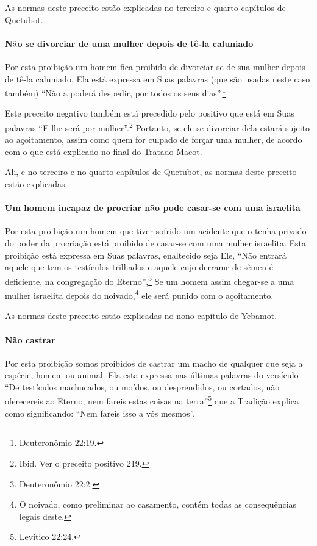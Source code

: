 As normas deste preceito estão explicadas no terceiro e quarto capítulos de Quetubot.

\paragraph{Não se divorciar de uma mulher depois de tê-la caluniado}

Por esta proibição um homem fica proibido de divorciar-se de sua mulher
depois de tê-la caluniado. Ela está expressa em Suas palavras (que são
usadas neste caso também) ``Não a poderá despedir, por todos os seus
dias''.\footnote{Deuteronômio 22:19.}

Este preceito negativo também está precedido pelo positivo que está em
Suas palavras ``E lhe será por mulher''.\footnote{Ibid. Ver o preceito positivo 219.}
Portanto, se ele se divorciar dela estará sujeito ao açoitamento, assim
como quem for culpado de forçar uma mulher, de acordo com o que está
explicado no final do Tratado Macot.

Ali, e no terceiro e no quarto capítulos de Quetubot, as normas deste
preceito estão explicadas.

\paragraph{Um homem incapaz de procriar não pode casar-se com uma israelita}

Por esta proibição um homem que tiver sofrido um acidente que o tenha
privado do poder da procriação está proibido de casar-se com uma mulher
israelita. Esta proibição está expressa em Suas palavras, enaltecido
seja Ele, ``Não entrará aquele que tem os testículos trilhados e aquele
cujo derrame de sêmen é deficiente, na congregação do Eterno'',\footnote{Deuteronômio 22:2.} Se um homem assim chegar-se a uma mulher israelita
depois do noivado,\footnote{O noivado, como preliminar ao casamento, contém todas as
consequências legais deste.} ele será punido com o
açoitamento.

As normas deste preceito estão explicadas no nono capítulo de Yebamot.

\paragraph{Não castrar}

Por esta proibição somos proibidos de castrar um macho de qualquer que
seja a espécie, homem ou animal. Ela esta expressa nas últimas palavras
do versículo ``De testículos machucados, ou moídos, ou desprendidos, ou
cortados, não oferecereis ao Eterno, nem fareis estas coisas na terra''\footnote{Levítico 22:24.} que a Tradição explica como significando: ``Nem fareis
isso a vós mesmos''.

